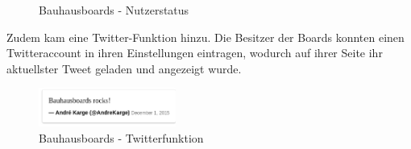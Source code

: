 \begin{figure}
  \centering
  \caption{Bauhausboards - Nutzerstatus}
  \label{img:UserAvailable}
\end{figure}
Zudem kam eine Twitter-Funktion hinzu. Die Besitzer der Boards konnten einen Twitteraccount in ihren Einstellungen eintragen, wodurch auf ihrer Seite ihr aktuellster Tweet geladen und angezeigt wurde. 
\begin{figure}
  \centering
    \includegraphics[width=0.4\textwidth]{./img/TwitterFeature.png}
  \caption{Bauhausboards - Twitterfunktion}
  \label{img:twitter}
\end{figure}


